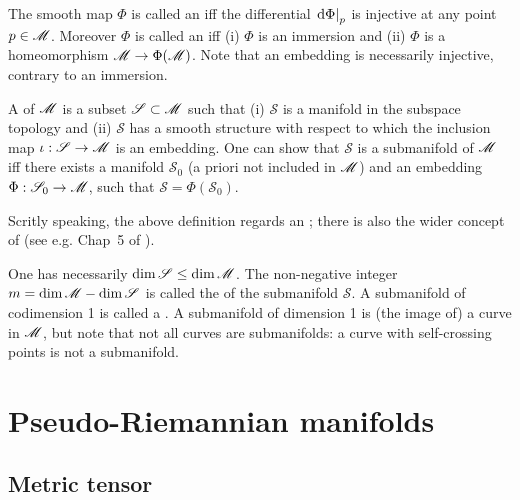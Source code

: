 The smooth map $\Phi$ is called an  iff
the differential $\left.\mathrm{d}\Phi \right| _p$ is injective at any point $p\in\mathscr{M}$.
Moreover $\Phi$ is called an  iff (i) $\Phi$
is an immersion and (ii) $\Phi$ is a homeomorphism $\mathscr{M} \rightarrow \Phi(\mathscr{M})$.
Note that an embedding is necessarily injective, contrary to an immersion.

A  of $\mathscr{M}$ is a subset $\mathscr{S}\subset \mathscr{M}$ such
that (i) $\mathscr{S}$ is a manifold in the subspace topology and (ii)
$\mathscr{S}$ has a smooth structure with respect to which
the inclusion map $\iota: \mathscr{S} \rightarrow \mathscr{M}$ is an embedding.
One can show that $\mathscr{S}$ is a submanifold of $\mathscr{M}$ iff there exists
a manifold $\mathscr{S}_0$ (a priori not included in $\mathscr{M}$) and an
embedding $\Phi: \mathscr{S}_0 \rightarrow \mathscr{M}$, such that
$\mathscr{S} = \Phi(\mathscr{S}_0)$.

\begin{remark}
Scritly speaking, the above definition regards an
;
there is also the wider concept of  (see e.g. Chap~5 of \cite{Lee13}).
\end{remark}


One has necessarily $\dim \mathscr{S} \leq \dim \mathscr{M}$. The non-negative integer
$m = \dim\mathscr{M} - \dim\mathscr{S}$ is called the 
of the submanifold $\mathscr{S}$. A submanifold of codimension 1 is called
a . A submanifold of dimension 1 is
(the image of) a curve in $\mathscr{M}$, but note that not all curves are submanifolds:
a curve with self-crossing points is not a submanifold.






\section{Pseudo-Riemannian manifolds} \label{s:bas:pRiemManif}

\subsection{Metric tensor} \label{s:bas:metric}

